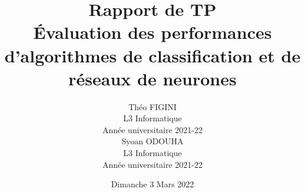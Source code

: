 \documentclass[12pt]{report}
\title{{\huge \bfseries Rapport de TP}\\[0.2cm]
		{\Large \'Evaluation des performances d'algorithmes de classification et de réseaux de neurones}}
\author{Théo \textsc{FIGINI}\\L3 Informatique\\Année universitaire 2021-22\\ [1.5cm]
				Syoan \textsc{ODOUHA}\\L3 Informatique\\Année universitaire 2021-22}
\date{Dimanche 3 Mars 2022}
\begin{document}


\renewcommand{\thefigure}{\arabic{figure}}
\setcounter{figure}{0}

\tableofcontents




\end{document}
